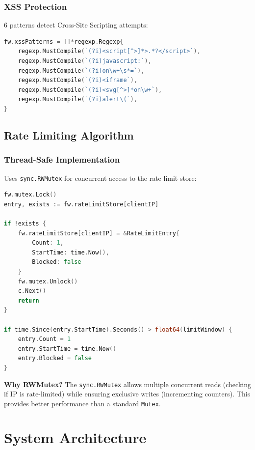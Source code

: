 \documentclass[11pt,a4paper]{report}
\begin{document}
\subsection{XSS Protection}
6 patterns detect Cross-Site Scripting attempts:
\begin{lstlisting}[language=Go, caption=XSS Detection Patterns (Lines 64-71)]
fw.xssPatterns = []*regexp.Regexp{
    regexp.MustCompile(`(?i)<script[^>]*>.*?</script>`),
    regexp.MustCompile(`(?i)javascript:`),
    regexp.MustCompile(`(?i)on\w+\s*=`),
    regexp.MustCompile(`(?i)<iframe`),
    regexp.MustCompile(`(?i)<svg[^>]*on\w+`),
    regexp.MustCompile(`(?i)alert\(`),
}
\end{lstlisting}

\section{Rate Limiting Algorithm}

\subsection{Thread-Safe Implementation}
Uses \texttt{sync.RWMutex} for concurrent access to the rate limit store:

\begin{lstlisting}[language=Go, caption=Rate Limiter Logic (Lines 222-242)]
fw.mutex.Lock()
entry, exists := fw.rateLimitStore[clientIP]

if !exists {
    fw.rateLimitStore[clientIP] = &RateLimitEntry{
        Count: 1, 
        StartTime: time.Now(), 
        Blocked: false
    }
    fw.mutex.Unlock()
    c.Next()
    return
}

if time.Since(entry.StartTime).Seconds() > float64(limitWindow) {
    entry.Count = 1
    entry.StartTime = time.Now()
    entry.Blocked = false
}
\end{lstlisting}

\begin{notebox}
\textbf{Why RWMutex?} The \texttt{sync.RWMutex} allows multiple concurrent reads (checking if IP is rate-limited) while ensuring exclusive writes (incrementing counters). This provides better performance than a standard \texttt{Mutex}.
\end{notebox}

\chapter{System Architecture}
\end{document}
